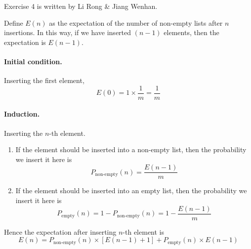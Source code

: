 


\def\HWTITLE{Homework 6}
\def\COURSECODE{CS 225: Data Structures}
\def\AUTHOR{Group D1}



\makeMyTitle

Exercise 4 is written by Li Rong \& Jiang Wenhan.

\thispagestyle{firstPage}

\begin{questions}



    Define $E(n)$ as the expectation of the number of non-empty lists after $n$ insertions. In this way, if we have inserted $(n-1)$ elements, then the expectation is $E(n-1)$.

    \paragraph{Initial condition.}Inserting the first element, \[E(0)=1\times \frac{1}{m} = \frac{1}{m}\]
    \paragraph{Induction.}Inserting the $n$-th element.

    \begin{enumerate}
        \item If the element should be inserted into a non-empty list, then the probability we insert it here is
              \begin{equation}
                  \label{eq1}
                  P_\text{non-empty}(n)=\frac{E(n-1)}{m}
              \end{equation}


        \item If the element should be inserted into an empty list, then the probability we insert it here is
              \begin{equation}
                  \label{eq2}
                  P_\text{empty}(n)=1-P_\text{non-empty}(n) = 1-\frac{E(n-1)}{m}
              \end{equation}
    \end{enumerate}

    Hence the expectation after inserting $n$-th element is
    \begin{equation}
        \label{eq3}
        E(n) = P_\text{non-empty}(n)\times \left[E(n-1)+1 \right] + P_\text{empty}(n)\times E(n-1)
    \end{equation}


\end{questions}
